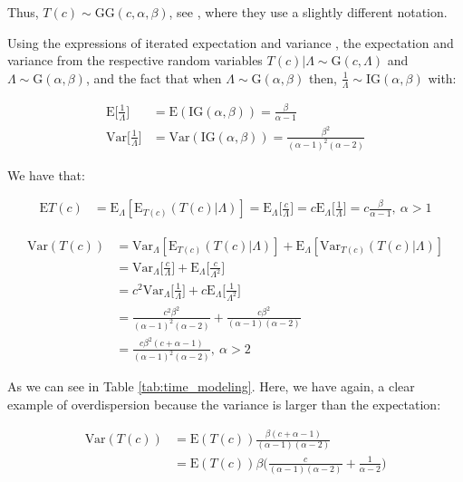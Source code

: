 Thus, $T(c)\sim \textrm{GG} (c, \alpha, \beta)$, see \cite{held2014applied}, where they use a slightly different notation.

Using the expressions of iterated expectation and variance \citep{held2014applied}, the expectation and variance from the respective random variables $T(c)|\Lambda \sim \textrm{G}(c, \Lambda)$ and $\Lambda \sim \textrm{G}(\alpha,\beta)$, and the fact that when $\Lambda \sim \textrm{G}(\alpha, \beta)$ then, $\frac{1}{\Lambda} \sim \textrm{IG}(\alpha, \beta)$ with:

\begin{align*}
\textrm{E}\Bigg [\frac{1}{\Lambda}\Bigg ] &=\textrm{E}(\textrm{IG}(\alpha, \beta)) = \frac{\beta}{\alpha-1}\\
\textrm{Var}\Bigg [\frac{1}{\Lambda}\Bigg ] & =\textrm{Var}(\textrm{IG}(\alpha, \beta)) = \frac{\beta^2}{(\alpha-1)^2(\alpha-2)}
\end{align*}

We have that:

\begin{align*}
\textrm{E}T(c) &= \textrm{E}_{\Lambda}[\textrm{E}_{T(c)} (T(c)|\Lambda)] = \textrm{E}_{\Lambda}\Bigg [\frac{c}{\Lambda}\Bigg ] = c \textrm{E}_{\Lambda}\Bigg [\frac{1}{\Lambda}\Bigg ] = c\frac{\beta}{\alpha-1}, \ \alpha>1
\end{align*}


\begin{align*}
\textrm{Var}(T(c)) &= \textrm{Var}_{\Lambda}[\textrm{E}_{T(c)} (T(c)|\Lambda)] + \textrm{E}_{\Lambda}[\textrm{Var}_{T(c)}(T(c)|\Lambda)]\\
&=\textrm{Var}_{\Lambda}\Bigg [\frac{c}{\Lambda}\Bigg ] + \textrm{E}_{\Lambda}\Bigg [\frac{c}{\Lambda^2}\Bigg ] \\
&=c^2\textrm{Var}_{\Lambda}\Bigg [\frac{1}{\Lambda}\Bigg ] + c\textrm{E}_{\Lambda}\Bigg [\frac{1}{\Lambda^2}\Bigg ] \\
&=\frac{c^2\beta^2}{(\alpha-1)^2(\alpha-2)} + \frac{c\beta^2}{(\alpha-1)(\alpha-2)}\\
&=\frac{c\beta^2(c+\alpha-1)}{(\alpha-1)^2(\alpha-2)}, \ \alpha>2
\end{align*}

As we can see in Table \ref{tab:time_modeling}. Here, we have again, a clear example of overdispersion because the variance is larger than the expectation:

\begin{align*}
\textrm{Var}(T(c))&=\textrm{E}(T(c))\frac{\beta(c+\alpha-1)}{(\alpha-1)(\alpha-2)}\\
&=\textrm{E}(T(c))\beta\Bigg(\frac{c}{(\alpha-1)(\alpha-2)}+\frac{1}{\alpha-2}\Bigg)
\end{align*}

